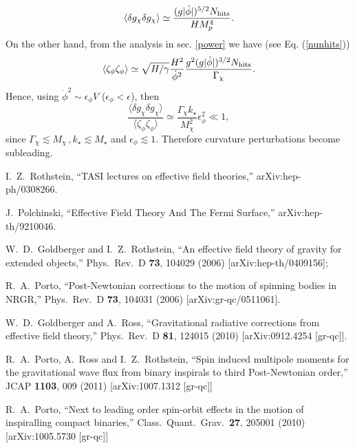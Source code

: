 \documentclass[11pt,amsmath,floats,floatfix,nofootinbib,secnumarabic, superscriptaddress, tightenlines]{revtex4}
\newcommand{\beq}{\begin{equation}}
\newcommand{\eeq}{\end{equation}}
\begin{document}
{\beq
\langle\delta g_\chi\delta g_\chi\rangle \simeq \frac{(g|\dot\phi|)^{5/2}N_{\rm hits}}{HM_p^4}.
\eeq
On the other hand, from the analysis in sec. \ref{power} we have (see Eq. (\ref{nunhits}))
\beq
\langle\zeta_\phi\zeta_\phi\rangle \simeq \sqrt{H/\gamma} \frac{H^2}{\dot\phi^2} \frac{g^2(g|\dot\phi|)^{3/2}N_{\rm hits}}{\Gamma_\chi}.
\eeq
Hence, using $\dot\phi^2 \sim \epsilon_\phi V$ ($\epsilon_\phi < \epsilon$), then \beq
 \frac{\langle\delta g_\chi\delta g_\chi\rangle}{\langle\zeta_\phi\zeta_\phi\rangle} \simeq \frac{\Gamma_\chi k_\star}{M_\chi^2} \epsilon_\phi^2 \ll 1,\eeq  since $\Gamma_\chi\lesssim M_\chi\,, k_\star\lesssim M_\star$ and $\epsilon_\phi\lesssim 1$. Therefore curvature perturbations become subleading.



\begin{thebibliography}{00}


 I.~Z.~Rothstein,
  ``TASI lectures on effective field theories,''
  arXiv:hep-ph/0308266.

   J.~Polchinski,
  ``Effective Field Theory And The Fermi Surface,''
  arXiv:hep-th/9210046.

 W.~D.~Goldberger and I.~Z.~Rothstein, ``An effective field theory of gravity for extended objects,'' Phys.\ Rev.\  D {\bf 73}, 104029 (2006)
  [arXiv:hep-th/0409156];

  R.~A.~Porto, ``Post-Newtonian corrections to the motion of spinning bodies in NRGR,'' Phys.\ Rev.\  D {\bf 73}, 104031 (2006) [arXiv:gr-qc/0511061].

 W.~D.~Goldberger and A.~Ross,  ``Gravitational radiative corrections from effective field theory,'' Phys.\ Rev.\  D {\bf 81}, 124015 (2010) [arXiv:0912.4254 [gr-qc]].

  R.~A.~Porto, A.~Ross and I.~Z.~Rothstein, ``Spin induced multipole moments for the gravitational wave flux from binary inspirals to third Post-Newtonian order,''  JCAP {\bf 1103}, 009 (2011) [arXiv:1007.1312 [gr-qc]]

 R.~A.~Porto,  ``Next to leading order spin-orbit effects in the motion of inspiralling
  compact binaries,'' Class.\ Quant.\ Grav.\  {\bf 27}, 205001 (2010) [arXiv:1005.5730 [gr-qc]]


\end{thebibliography}}
\end{document}
